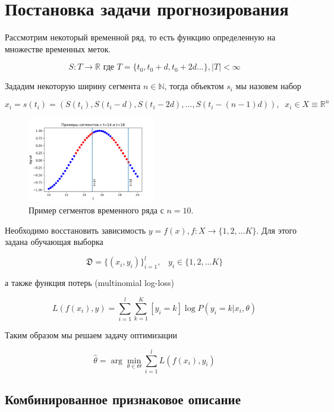 \documentclass[12pt, fleqn, unicode]{article}
\newcommand{\R}{\mathbb{R}}
\newcommand{\N}{\mathbb{N}}
\begin{document}
\newpage
\section{Постановка задачи прогнозирования}

Рассмотрим некоторый временной ряд, то есть функцию определенную на множестве
временных меток.

$$
S: T \to \R \text{ где } T = \{t_0, t_0 + d, t_0 + 2d \ldots\}, |T| < \infty
$$

Зададим некоторую ширину сегмента $n \in \N$, тогда объектом $s_i$ мы
назовем набор

$$
x_i = s(t_i) = (S(t_i), S(t_i - d), S(t_i - 2d), \ldots, S(t_i - (n - 1)d)),
\;\; x_i \in X \equiv \R^n
$$

\begin{figure}[ht]
    \caption{Пример сегментов временного ряда с $n=10$.}
    \centering
      \includegraphics[width=0.5\textwidth]{../pics/segment_def.png}
\end{figure}

Необходимо восстановить зависимость $y = f(x), f: X \to \{1, 2, \ldots K\}$.
Для этого задана обучающая выборка

$$
\mathfrak{D} = \{ (x_i, y_i) \}_{i=1}^l, \;\;\; y_i \in \{1, 2, \ldots K\}
$$

а также функция потерь (multinomial log-loss)

\begin{equation} \label{init-logloss}
L(f(x_i), y) = \sum_{i=1}^l\sum_{k=1}^K [y_i = k]\log P(y_i = k| x_i, \theta)
\end{equation}

Таким образом мы решаем задачу оптимизации

$$
\hat{\theta} = \arg\min_{\theta \in \Theta} \sum_{i = 1}^l L(f(x_i), y_i)
$$

\subsection{Комбинированное признаковое описание}
\end{document}
